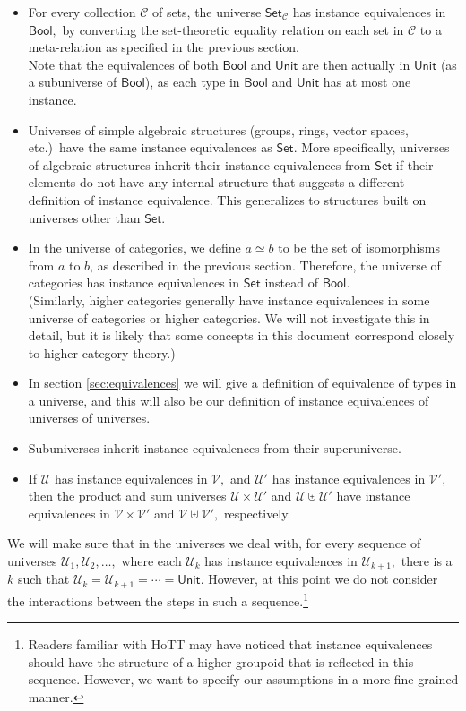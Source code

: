 \documentclass[a4paper]{article}
\theoremstyle{definition}
\theoremstyle{remark}
\renewcommand{\equiv}{\simeq}
\newcommand{\C}{\mathcal{C}}
\newcommand{\U}{\mathcal{U}}
\newcommand{\V}{\mathcal{V}}
\newcommand{\nm}{\mathsf}
\newcommand{\universe}{\nm}
\newcommand{\Unit}{\universe{Unit}}
\newcommand{\Bool}{\universe{Bool}}
\newcommand{\Set}{\universe{Set}}
\begin{document}
\begin{itemize}
  \item For every collection $\C$ of sets, the universe $\Set_\C$ has instance equivalences
  in $\Bool,$ by converting the set-theoretic equality relation on each set in $\C$ to a
  meta-relation as specified in the previous section.\\
  Note that the equivalences of both $\Bool$ and $\Unit$ are then actually in $\Unit$ (as a
  subuniverse of $\Bool$), as each type in $\Bool$ and $\Unit$ has at most one instance.
  \item Universes of simple algebraic structures (groups, rings, vector spaces, etc.)\ have
  the same instance equivalences as $\Set.$ More specifically, universes of algebraic
  structures inherit their instance equivalences from $\Set$ if their elements do not have
  any internal structure that suggests a different definition of instance equivalence.
  This generalizes to structures built on universes other than $\Set.$
  \item In the universe of categories, we define $a \equiv b$ to be the set of
  isomorphisms from $a$ to $b$, as described in the previous section. Therefore, the
  universe of categories has instance equivalences in $\Set$ instead of $\Bool.$\\
  (Similarly, higher categories generally have instance equivalences in some universe of
  categories or higher categories. We will not investigate this in detail, but it is likely
  that some concepts in this document correspond closely to higher category theory.)
  \item In section \ref{sec:equivalences} we will give a definition of equivalence of types in
  a universe, and this will also be our definition of instance equivalences of universes of
  universes.
  \item Subuniverses inherit instance equivalences from their superuniverse.
  \item If $\U$ has instance equivalences in $\V,$ and $\U'$ has instance equivalences in
  $\V',$ then the product and sum universes $\U \times \U'$ and $\U \uplus \U'$ have instance
  equivalences in $\V \times \V'$ and $\V \uplus \V',$ respectively.
\end{itemize}

We will make sure that in the universes we deal with, for every sequence of universes
$\U_1, \U_2, \ldots,$ where each $\U_k$ has instance equivalences in $\U_{k+1},$ there is
a $k$ such that $\U_k = \U_{k+1} = \cdots = \Unit.$ However, at this point we do not consider
the interactions between the steps in such a sequence.\footnote{Readers familiar with HoTT may
have noticed that instance equivalences should have the structure of a higher groupoid that is
reflected in this sequence. However, we want to specify our assumptions in a more fine-grained
manner.}
\end{document}
